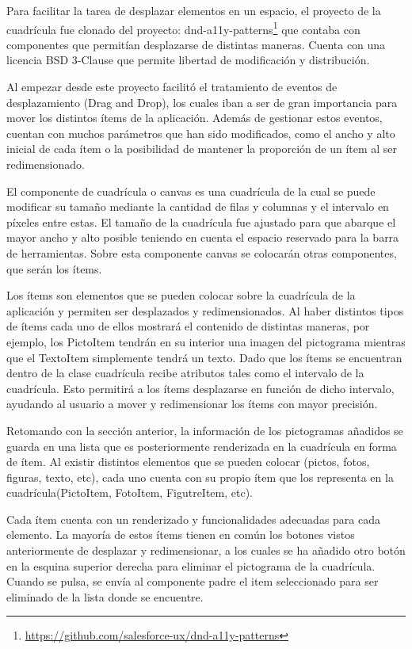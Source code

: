 Para facilitar la tarea de desplazar elementos en un espacio, el proyecto de la cuadrícula fue clonado del proyecto:  dnd-a11y-patterns\footnote{\url{https://github.com/salesforce-ux/dnd-a11y-patterns}} que contaba con componentes que permitían desplazarse de distintas maneras. Cuenta con una licencia BSD 3-Clause que permite libertad de modificación y distribución.


Al empezar desde este proyecto facilitó el  tratamiento de eventos de desplazamiento (Drag and Drop), los cuales iban a ser de gran importancia para mover los distintos ítems de la aplicación. Además de gestionar estos eventos, cuentan con muchos parámetros que han sido modificados, como el ancho y alto inicial de cada ítem o la posibilidad de mantener la proporción de un ítem al ser redimensionado.

El componente de cuadrícula o canvas es una cuadrícula de la cual se puede modificar su tamaño mediante la cantidad de filas y columnas y el intervalo en píxeles entre estas. El tamaño de la cuadrícula fue ajustado para que abarque el mayor ancho y alto posible teniendo en cuenta el espacio reservado para la barra de herramientas. Sobre esta componente canvas se colocarán otras componentes, que serán los ítems. 

Los ítems son elementos que se pueden colocar sobre la cuadrícula de la aplicación y permiten ser desplazados y redimensionados. Al haber distintos tipos de ítems cada uno de ellos mostrará el contenido de distintas maneras, por ejemplo, los PictoItem tendrán en su interior una imagen del pictograma mientras que el TextoItem simplemente tendrá un texto. Dado que los ítems se encuentran dentro de la clase cuadrícula recibe atributos tales como el intervalo de la cuadrícula. Esto permitirá a los ítems desplazarse en función de dicho intervalo, ayudando al usuario a mover y redimensionar los ítems con mayor precisión. 

Retomando con la sección anterior, la información de los pictogramas añadidos se guarda en una lista que es posteriormente renderizada en la cuadrícula en forma de ítem. Al existir distintos elementos que se pueden colocar (pictos, fotos, figuras, texto, etc), cada uno cuenta con su propio  ítem que los representa en la cuadrícula(PictoItem, FotoItem, FigutreItem, etc).

Cada ítem cuenta con un renderizado y funcionalidades adecuadas para cada elemento. La mayoría de estos ítems tienen en común los botones vistos anteriormente de desplazar y redimensionar, a los cuales se ha añadido otro botón en la esquina superior derecha para eliminar el pictograma de la cuadrícula. Cuando se pulsa, se envía al componente padre el item seleccionado para ser eliminado de la lista donde se encuentre.

